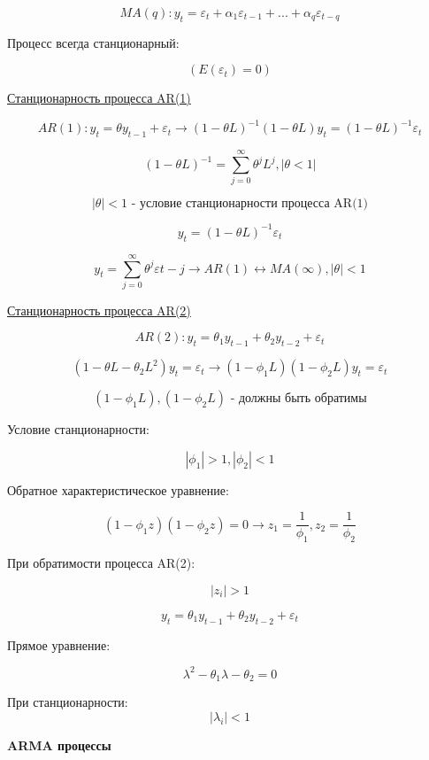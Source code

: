 \documentclass[a4paper, 12pt]{article}
\begin{document}
\[MA(q): y_{t} = \varepsilon_{t} + \alpha_{1}\varepsilon_{t - 1} + ... + \alpha_{q}\varepsilon_{t - q}\]

Процесс всегда станционарный: 

\[(E(\varepsilon_{t}) = 0)\]

\begin{center}
    \underline{Станционарность процесса AR(1)}
\end{center}

\[AR(1): y_{t} = \theta y_{t - 1} + \varepsilon_{t} \rightarrow (1 - \theta L)^{-1} (1 - \theta L)y_{t} = (1 - \theta L)^{-1}\varepsilon_{t}\]

\[(1 - \theta L)^{-1} = \sum_{j = 0}^{\infty}\theta^{j}L^{j}, |\theta < 1|\]

\[|\theta| < 1\textrm{ - условие станционарности процесса AR(1)}\]

\[y_{t} = (1 - \theta L)^{-1}\varepsilon_{t}\]

\[y_{t} = \sum_{j = 0}^{\infty} \theta^{j}\varepsilon{t - j} \rightarrow AR(1) \leftrightarrow MA(\infty), |\theta| < 1\]

\begin{center}
    \underline{Станционарность процесса AR(2)}
\end{center}

\[AR(2): y_{t} = \theta_{1}y_{t-1} + \theta_{2}y_{t - 2} + \varepsilon_{t}\]

\[(1 - \theta L - \theta_{2} L^{2})y_{t} = \varepsilon_{t} \rightarrow (1 - \phi_{1}L)(1 - \phi_{2}L)y_{t} = \varepsilon_{t}\]

\[(1 - \phi_{1}L), (1 - \phi_{2}L)\textrm{ - должны быть обратимы}\]

Условие станционарности:

\[|\phi_{1}| > 1, |\phi_{2}| < 1\]

Обратное характеристическое уравнение: 

\[(1 - \phi_{1}z)(1 - \phi_{2}z) = 0 \rightarrow z_{1} = \frac{1}{\phi_{1}}, z_{2} = \frac{1}{\phi_{2}}\]

При обратимости процесса AR(2): 

\[|z_{i}| > 1\]

\[y_{t} = \theta_{1}y_{t - 1} + \theta_{2}y_{t - 2} + \varepsilon_{t}\]

Прямое уравнение: 

\[\lambda^{2} - \theta_{1}\lambda - \theta_{2} = 0\]

При станционарности: \[|\lambda_{i}| < 1\]


\begin{center}
    \textbf{ARMA процессы}
\end{center}
\end{document}
